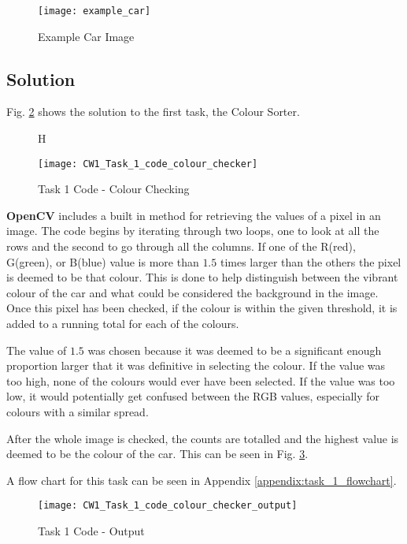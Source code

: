 \documentclass[conference]{IEEEtran}
\begin{document}
\begin{figure}
\centerline{\texttt{[image: example\_car]}}
\caption{Example Car Image}
\label{fig:example_car}
\end{figure}

\subsection{Solution}
Fig. \ref{fig:CW1_Task_1_code_colour_checker} shows the solution to the first task, the Colour Sorter.

\begin{figure}{H}
\centerline{\texttt{[image: CW1\_Task\_1\_code\_colour\_checker]}}
\caption{Task 1 Code - Colour Checking}
\label{fig:CW1_Task_1_code_colour_checker}
\end{figure}

\textbf{OpenCV} includes a built in method for retrieving the values of a pixel in an image. The code begins by iterating through two loops, one to look at all the rows and the second to go through all the columns. If one of the R(red), G(green), or B(blue) value is more than $1.5$ times larger than the others the pixel is deemed to be that colour. This is done to help distinguish between the vibrant colour of the car and what could be considered the background in the image. Once this pixel has been checked, if the colour is within the given threshold, it is added to a running total for each of the colours.

The value of $1.5$ was chosen because it was deemed to be a significant enough proportion larger that it was definitive in selecting the colour. If the value was too high, none of the colours would ever have been selected. If the value was too low, it would potentially get confused between the RGB values, especially for colours with a similar spread.

After the whole image is checked, the counts are totalled and the highest value is deemed to be the colour of the car. This can be seen in Fig. \ref{fig:CW1_Task_1_code_colour_checker_output}.

A flow chart for this task can be seen in Appendix \ref{appendix:task_1_flowchart}.

\begin{figure}
\centerline{\texttt{[image: CW1\_Task\_1\_code\_colour\_checker\_output]}}
\caption{Task 1 Code - Output}
\label{fig:CW1_Task_1_code_colour_checker_output}
\end{figure}
\end{document}
